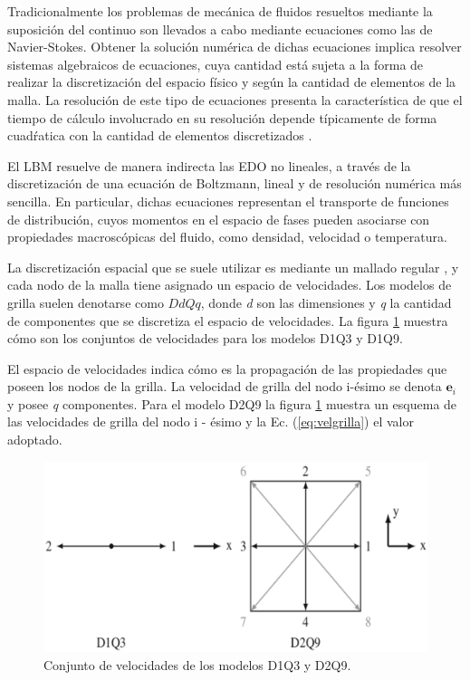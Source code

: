 Tradicionalmente los problemas de mecánica de fluidos resueltos mediante la suposición del continuo son llevados a cabo mediante  ecuaciones como las de Navier-Stokes. Obtener la solución numérica de dichas ecuaciones implica resolver sistemas  algebraicos de ecuaciones, cuya cantidad está sujeta a la forma de realizar la discretización del espacio físico y según la cantidad de elementos de la malla. La resolución de este tipo de ecuaciones presenta la característica de que el tiempo de cálculo involucrado en su resolución depende típicamente de forma cuadŕatica con la cantidad de elementos discretizados \cite{kelley1995iterative}.

El LBM resuelve de manera indirecta las EDO no lineales, a través de la discretización de una ecuación de Boltzmann, lineal y de resolución numérica más sencilla. En particular, dichas ecuaciones representan el transporte de funciones de distribución, cuyos momentos en el espacio de fases pueden asociarse con propiedades macroscópicas del fluido, como densidad, velocidad o temperatura.

La discretización espacial que se suele utilizar es mediante un mallado regular \cite{guo2013lattice}, y  cada nodo de la malla tiene asignado un espacio de velocidades. Los modelos de grilla suelen denotarse como $DdQq$, donde \textit{d} son las dimensiones y \textit{q} la cantidad de componentes que se discretiza el espacio de velocidades. La figura \ref{fig:D1Q3_D2Q9} muestra cómo son los conjuntos de velocidades para los modelos D1Q3 y D1Q9.

El espacio de velocidades indica cómo es la propagación de las propiedades que poseen los nodos de la grilla. La velocidad de grilla del nodo i-ésimo se denota $\mathbf{e}_{i}$ y posee \textit{q} componentes. Para el modelo D2Q9 la figura \ref{fig:D1Q3_D2Q9} muestra un esquema de las velocidades de grilla del nodo i - ésimo y la Ec. (\ref{eq:velgrilla}) el valor adoptado. 

\begin{figure}[h!]
	\centering
	\includegraphics[width=.8\textwidth]{figs/cap1/D1Q3_D2Q9}
	\caption{Conjunto de velocidades de los modelos D1Q3 y D2Q9. \cite{kruger2017lattice}}
	\label{fig:D1Q3_D2Q9}	
\end{figure}


